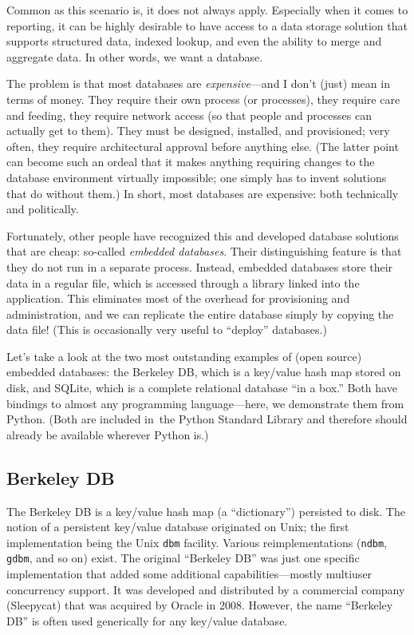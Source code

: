 Common as this scenario is, it does not always apply. Especially when
it comes to reporting, it can be highly desirable to have access to a
data storage solution that supports structured data, indexed lookup,
and even the ability to merge and aggregate data. In other words, 
we want a database.

The problem is that most databases are \emph{expensive}---and I don't
(just) mean in terms of money. They require their own process (or
processes), they require care and feeding, they require network access
(so that people and processes can actually get to them). They must be
designed, installed, and provisioned; very often, they require
architectural approval before anything else.  (The latter point can
become such an ordeal that it makes anything requiring changes to the
database environment virtually impossible; one simply has to invent
solutions that do without them.)  In short, most databases are
expensive: both technically and politically.

Fortunately, other people have recognized this and developed database
solutions that are cheap: so-called \emph{embedded databases}.  Their
distinguishing feature is that they do not run in a separate process.
Instead, embedded databases store their data in a regular file, which
is accessed through a library linked into the application. This
eliminates most of the overhead for provisioning and administration,
and we can replicate the entire database simply by copying the data
file! (This is occasionally very useful to ``deploy'' databases.)

Let's take a look at the two most outstanding examples of (open
source) embedded databases: the Berkeley DB, which is a key/value hash
map stored on disk, and SQLite, which is a complete relational
database ``in a box.'' Both have bindings to almost any programming
language---here, we demonstrate them from Python. (Both are included
in~the Python Standard Library and therefore should already be
available wherever Python is.)

\vspace*{-6pt}
\subsection{Berkeley DB}

The Berkeley DB is a key/value hash map (a ``dictionary'') persisted
to disk. The notion of a persistent key/value database originated on
Unix; the first implementation being the Unix \texttt{dbm} facility.
Various reimplementations (\texttt{ndbm}, \texttt{gdbm}, and so on)
exist. The original ``Berkeley DB'' was just one specific
implementation that added some additional capabilities---mostly
multiuser concurrency support. It was developed and distributed by a
commercial company (Sleepycat) that was acquired by Oracle in 2008.
However, the name ``Berkeley DB'' is often used generically for any
key/value database.

